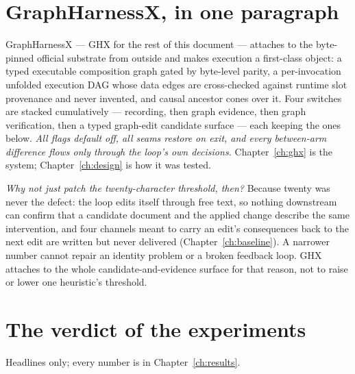 \section{GraphHarnessX, in one paragraph}
\label{sec:ghx-preview}

GraphHarnessX --- GHX for the rest of this document --- attaches to the
byte-pinned official substrate from outside and makes
execution a first-class object: a typed executable composition graph gated
by byte-level parity, a per-invocation unfolded execution DAG whose data
edges are cross-checked against runtime slot provenance and never invented,
and causal ancestor cones over it. Four switches are stacked cumulatively
--- recording, then graph evidence, then graph verification, then a typed
graph-edit candidate surface --- each keeping the ones below.
\emph{All flags default off, all seams restore on exit, and every
between-arm difference flows only through the loop's own decisions.}
Chapter~\ref{ch:ghx} is the system; Chapter~\ref{ch:design} is how it was
tested.

\emph{Why not just patch the twenty-character threshold, then?} Because
twenty was never the defect: the loop edits itself through free text, so
nothing downstream can confirm that a candidate document and the applied
change describe the same intervention, and four channels meant to carry
an edit's consequences back to the next edit are written but never
delivered (Chapter~\ref{ch:baseline}). A narrower number cannot repair an
identity problem or a broken feedback loop. GHX attaches to the whole
candidate-and-evidence surface for that reason, not to raise or lower one
heuristic's threshold.

\section{The verdict of the experiments}
\label{sec:verdict}

Headlines only; every number is in Chapter~\ref{ch:results}.

